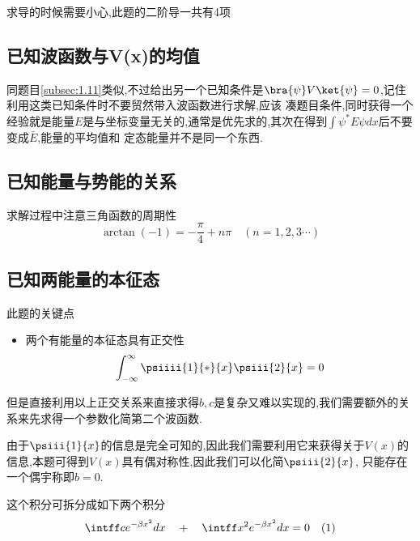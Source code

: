         求导的时候需要小心,此题的二阶导一共有4项
    
    \subsection{已知波函数与\texorpdfstring{V(x)}{}的均值}
        同题目\ref{subsec:1.11}类似,不过给出另一个已知条件是$\bra{\psi}V\ket{\psi}=0$,记住利用这类已知条件时不要贸然带入波函数进行求解,应该
        凑题目条件,同时获得一个经验就是能量$E$是与坐标变量无关的,通常是优先求的,其次在得到$\int \psi^{*}E\psi dx$后不要变成$\bar{E}$,能量的平均值和
        定态能量并不是同一个东西.

    \subsection{已知能量与势能的关系}
        求解过程中注意三角函数的周期性  
        $$  \arctan{(-1)}=-\frac{\pi}{4}+n\pi \quad (n=1,2,3 \cdots ) $$    
    
    \subsection{已知两能量的本征态}
        此题的关键点
        \begin{itemize}
            \item 两个有能量的本征态具有正交性
                  $$ \int_{-\infty}^{\infty} \psiiii{1}{*}{x} \psiii{2}{x}  = 0 $$
        \end{itemize}

        但是直接利用以上正交关系来直接求得$b,c$是复杂又难以实现的,我们需要额外的关系来先求得一个参数化简第二个波函数. 

        由于$\psiii{1}{x}$的信息是完全可知的,因此我们需要利用它来获得关于$V(x)$的信息,本题可得到$V(x)$具有偶对称性,因此我们可以化简$\psiii{2}{x}$,
        只能存在一个偶宇称即$b=0$.

        这个积分可拆分成如下两个积分
            $$ \intff c e^{-\beta x^{2}} dx  \quad + \quad   \intff x^{2} e^{-\beta x^{2}} dx=0 \quad (1)$$   
        
